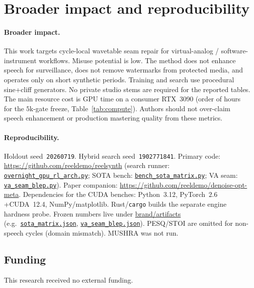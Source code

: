 \section{Broader impact and reproducibility}
\label{sec:ethics}

\paragraph{Broader impact.}
This work targets cycle-local wavetable seam repair for virtual-analog / software-instrument workflows.
Misuse potential is low.
The method does not enhance speech for surveillance, does not remove watermarks from protected media, and operates only on short synthetic periods.
Training and search use procedural sine{+}cliff generators. No private studio stems are required for the reported tables.
The main resource cost is GPU time on a consumer RTX~3090 (order of hours for the $5$k-gate freeze, Table~\ref{tab:compute}).
Authors should not over-claim speech enhancement or production mastering quality from these metrics.

\paragraph{Reproducibility.}
Holdout seed~\texttt{20260719}. Hybrid search seed~\texttt{1902771841}.
Primary code: \url{https://github.com/reeldemo/reelsynth}
(search runner:
\href{https://github.com/reeldemo/reelsynth/blob/main/scripts/overnight_gpu_rl_arch.py}{\texttt{overnight\_gpu\_rl\_arch.py}};
SOTA bench:
\href{https://github.com/reeldemo/reelsynth/blob/main/scripts/bench_sota_matrix.py}{\texttt{bench\_sota\_matrix.py}};
VA seam:
\href{https://github.com/reeldemo/reelsynth/blob/main/scripts/baselines/va_seam_blep.py}{\texttt{va\_seam\_blep.py}}).
Paper companion: \url{https://github.com/reeldemo/denoise-opt-meta}.
Dependencies for the CUDA benches: Python~3.12, PyTorch~$2.6$+CUDA~12.4, NumPy/matplotlib. Rust/\texttt{cargo} builds the separate engine hardness probe.
Frozen numbers live under
\href{https://github.com/reeldemo/reelsynth/tree/main/brand/artifacts}{brand/artifacts}
(e.g.\
\href{https://github.com/reeldemo/reelsynth/blob/main/brand/artifacts/sota_matrix.json}{\texttt{sota\_matrix.json}},
\href{https://github.com/reeldemo/reelsynth/blob/main/brand/artifacts/va_seam_blep.json}{\texttt{va\_seam\_blep.json}}).
PESQ/STOI are omitted for non-speech cycles (domain mismatch). MUSHRA was not run.

\subsection{Funding}
\label{sec:funding}
This research received no external funding.

